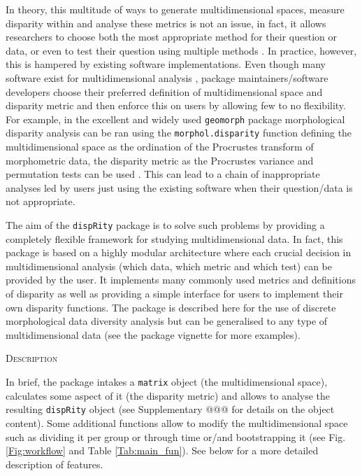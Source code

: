 \documentclass[12pt,letterpaper]{article}
\renewcommand{\section}[1]{%
\bigskip
\begin{center}
\begin{Large}
\normalfont\scshape #1
\medskip
\end{Large}
\end{center}}
\newcommand{\disp}{\texttt{dispRity} }
\begin{document}
In theory, this multitude of ways to generate multidimensional spaces, measure disparity within and analyse these metrics is not an issue, in fact, it allows researchers to choose both the most appropriate method for their question or data, or even to test their question using multiple methods \citep[such as][for biogreography]{matzke2013biogeobears}.
In practice, however, this is hampered by existing software implementations.
Even though many software exist for multidimensional analysis \citep[e.g.][]{bouxin2005ginkgo,de2007ginkgo,oksanen2007vegan,adams2013geomorph,Claddis,adams2017geometric}, package maintainers/software developers choose their preferred definition of multidimensional space and disparity metric and then enforce this on users by allowing few to no flexibility.
For example, in the excellent and widely used \texttt{geomorph} package morphological disparity analysis can be ran using the \texttt{morphol.disparity} function defining the multidimensional space as the ordination of the Procrustes transform of morphometric data, the disparity metric as the Procrustes variance and permutation tests can be used \citep{zelditch2012geometric,adams2013geomorph,adams2017geometric}.
This can lead to a chain of inappropriate analyses led by users just using the existing software when their question/data is not appropriate. %

The aim of the \disp package is to solve such problems by providing a completely flexible framework for studying multidimensional data.
In fact, this package is based on a highly modular architecture where each crucial decision in multidimensional analysis (which data, which metric and which test) can be provided by the user.
It implements many commonly used metrics and definitions of disparity as well as providing a simple interface for users to implement their own disparity functions.
The package is described here for the use of discrete morphological data diversity analysis but can be generalised to any type of multidimensional data (see the package vignette for more examples).

\section{Description}
In brief, the package intakes a \texttt{matrix} object (the multidimensional space), calculates some aspect of it (the disparity metric) and allows to analyse the resulting \disp object (see Supplementary @@@ for details on the object content).
Some additional functions allow to modify the multidimensional space such as dividing it per group or through time or/and bootstrapping it (see Fig. \ref{Fig:workflow} and Table \ref{Tab:main_fun}).
See below for a more detailed description of features.
\end{document}
